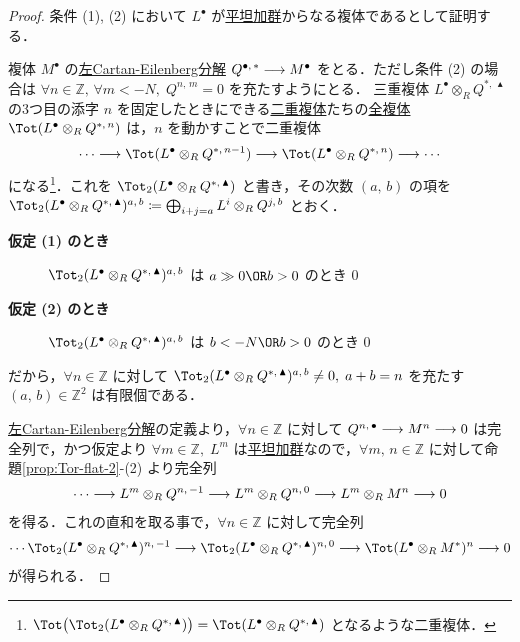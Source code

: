 \documentclass[algtopo_main]{subfiles}
\begin{document}
\begin{proof}
    条件 (1), (2) において $L^\bullet$ が\hyperref[def:flat-mod]{平坦加群}からなる複体であるとして証明する．

    複体 $M^\bullet$ の\hyperref[prop:Cartan-Eilenberg-L]{左Cartan-Eilenberg分解} $Q^{\bullet,\, *} \longrightarrow M^\bullet$ をとる．ただし条件 (2) の場合は $\forall n \in \mathbb{Z},\, \forall m < -N,\; Q^{n,\, m} = 0$ を充たすようにとる．
    三重複体 $L^\bullet \otimes_R Q^{*,\, \blacktriangle}$ の3つ目の添字 $n$ を固定したときにできる\hyperref[def:double-complex]{二重複体}たちの\hyperref[def:Tot]{全複体} $\Tot (L^\bullet \otimes_R Q^{*,\, n})$ は，$n$ を動かすことで二重複体
    \begin{align}
        \cdots \lto \Tot (L^\bullet \otimes_R Q^{*,\, n-1}) \lto \Tot (L^\bullet \otimes_R Q^{*,\, n}) \lto \cdots
    \end{align}
    になる\footnote{$\Tot \bigl(\Tot_2(L^\bullet \otimes_R Q^{*,\, \blacktriangle})\bigr) = \Tot (L^\bullet \otimes_R Q^{*,\, \blacktriangle})$ となるような二重複体．}．これを $\Tot_2(L^\bullet \otimes_R Q^{*,\, \blacktriangle})$ と書き，その次数 $(a,\, b)$ の項を $\Tot_2(L^\bullet \otimes_R Q^{*,\, \blacktriangle})^{a,\, b} \coloneqq \bigoplus_{i+j = a} L^i \otimes_R Q^{j,\,b}$ とおく．
    \begin{description}
        \item[\textbf{仮定 (1) のとき}] $\Tot_2(L^\bullet \otimes_R Q^{*,\, \blacktriangle})^{a,\, b}$ は $a \gg 0 \OR b > 0$ のとき $0$
        \item[\textbf{仮定 (2) のとき}] $\Tot_2(L^\bullet \otimes_R Q^{*,\, \blacktriangle})^{a,\, b}$ は $b < -N \OR b > 0$ のとき $0$
    \end{description}
    だから，$\forall n \in \mathbb{Z}$ に対して $\Tot_2(L^\bullet \otimes_R Q^{*,\, \blacktriangle})^{a,\, b} \neq 0,\; a+b = n$ を充たす $(a,\, b) \in \mathbb{Z}^2$ は有限個である．

    \hyperref[prop:Cartan-Eilenberg-L]{左Cartan-Eilenberg分解}の定義より，$\forall n \in \mathbb{Z}$ に対して $Q^{n,\, \bullet} \longrightarrow M^n \longrightarrow 0$ は完全列で，かつ仮定より $\forall m \in \mathbb{Z},\; L^m$ は\hyperref[def:flat-mod]{平坦加群}なので，$\forall m,\, n \in \mathbb{Z}$ に対して命題\ref{prop:Tor-flat-2}-(2) より完全列
    \begin{align}
        \cdots \longrightarrow L^m \otimes_R Q^{n,\, -1} \longrightarrow L^m \otimes_R Q^{n,\, 0} \longrightarrow L^m \otimes_R M^n \longrightarrow 0
    \end{align}
    を得る．これの直和を取る事で，$\forall n \in \mathbb{Z}$ に対して完全列
    \begin{align}
        \cdots \Tot_2(L^\bullet \otimes_R Q^{*,\, \blacktriangle})^{n,\, -1} \lto \Tot_2(L^\bullet \otimes_R Q^{*,\, \blacktriangle})^{n,\, 0} \lto \Tot(L^\bullet \otimes_R M^{*})^n \lto 0
    \end{align}
    が得られる．


\end{proof}
\end{document}
